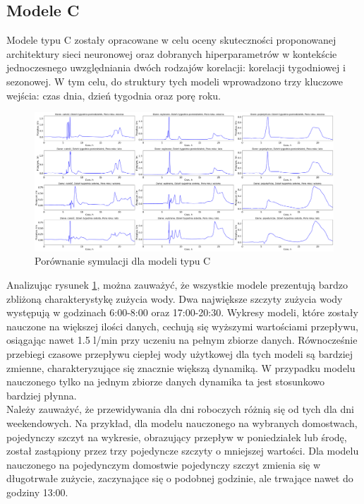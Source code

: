\documentclass[a4paper,twoside,12pt]{book}
\begin{document}
\subsection*{Modele C}
Modele typu C zostały opracowane w celu oceny skuteczności proponowanej architektury sieci neuronowej oraz dobranych hiperparametrów w kontekście jednoczesnego uwzględniania dwóch rodzajów korelacji: korelacji tygodniowej i sezonowej. W tym celu, do struktury tych modeli wprowadzono trzy kluczowe wejścia: czas dnia, dzień tygodnia oraz porę roku.
\begin{figure}[!h]
  \centering
  \includegraphics[width=1\textwidth]{img/Model_C.png}
  \caption{Porównanie symulacji dla modeli typu C}
  \label{fig:model_C}
\end{figure}

Analizując rysunek \ref{fig:model_C}, można zauważyć, że wszystkie modele prezentują bardzo zbliżoną charakterystykę zużycia wody. Dwa największe szczyty zużycia wody występują w godzinach 6:00-8:00 oraz 17:00-20:30. Wykresy modeli, które zostały nauczone na większej ilości danych, cechują się wyższymi wartościami przepływu, osiągając nawet 1.5 l/min przy uczeniu na pełnym zbiorze danych. Równocześnie przebiegi czasowe przepływu ciepłej wody użytkowej dla tych modeli są bardziej zmienne, charakteryzujące się znacznie większą dynamiką. W przypadku modelu nauczonego tylko na jednym zbiorze danych dynamika ta jest stosunkowo bardziej płynna.\\

Należy zauważyć, że przewidywania dla dni roboczych różnią się od tych dla dni weekendowych. Na przykład, dla modelu nauczonego na wybranych domostwach, pojedynczy szczyt na wykresie, obrazujący przepływ w poniedziałek lub środę, został zastąpiony przez trzy pojedyncze szczyty o mniejszej wartości. Dla modelu nauczonego na pojedynczym domostwie pojedynczy szczyt zmienia się w długotrwałe zużycie, zaczynające się o podobnej godzinie, ale trwające nawet do godziny 13:00.
\end{document}
